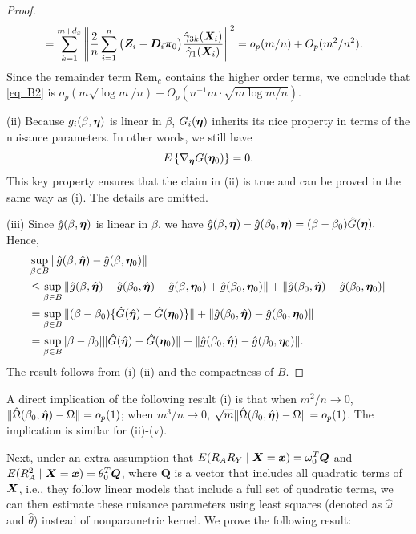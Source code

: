 \documentclass[12pt]{article}
\begin{document}
{\begin{proof}
\begin{align*}
	  &= \sum_{k=1}^{m+d_x}    \left\|  \frac2n \sum_{i=1}^n  \big( \bm{Z}_i-\bm D_i \bm\pi_0 \big)  \frac{\hat{\gamma}_{3k}(\bm{X}_i)}{\hat\gamma_1(\bm{X}_i)} \right\|^2  = o_p(m/n)+ O_p(m^2/n^2). 
\end{align*}
Since the remainder term $ \text{Rem}_c $ contains the higher order terms, we conclude that \eqref{eq: B2} is $ o_p(m\sqrt{\log m}/n) + O_p( n^{-1} m\cdot \sqrt{m\log m/n})$. 



(ii) Because $ g_i(\beta, \bm \eta) $ is linear in $ \beta $, $ G_i(\bm \eta) $ inherits its nice property in terms of the nuisance parameters. In other words, we still have 
\[
E\left\{ \nabla_{\bm \eta} G(\bm \eta_0)\right\} = 0.
\]
This key property ensures that the claim in (ii) is true and can be proved in the same way as (i). The details are omitted. 



(iii) Since $\hat g(\beta, \bm \eta)$ is linear in $\beta$, we have $ \hat g(\beta, \bm \eta)- \hat g(\beta_0, \bm \eta)= (\beta- \beta_0) \hat G(\bm \eta).$ Hence, 
\begin{align*}
    &\sup_{\beta\in B} \|\hat g(\beta, \hat{\bm \eta}) -\hat g(\beta, \bm \eta_0) \| \\
    &\leq   \sup_{\beta\in B} \|\hat g(\beta, \hat{\bm \eta}) - \hat g(\beta_0, \hat{\bm \eta}) -\hat g(\beta, \bm \eta_0) +\hat g(\beta_0, \bm \eta_0) \| + \|\hat g(\beta_0, \hat{\bm \eta}) -\hat g(\beta_0, \bm \eta_0) \| \\
    &= \sup_{\beta\in B} \|(\beta-\beta_0) \{\hat G(\hat {\bm \eta}) -  \hat G( \bm \eta_0)\}\| + \|\hat g(\beta_0, \hat{\bm \eta}) -\hat g(\beta_0, \bm \eta_0) \| \\
    &= \sup_{\beta\in B} |\beta-\beta_0| \| \hat G(\hat {\bm \eta}) -  \hat G( \bm \eta_0)\| + \|\hat g(\beta_0, \hat{\bm \eta}) -\hat g(\beta_0, \bm \eta_0) \|. 
\end{align*}
The result follows from (i)-(ii) and the compactness of $B$. 


\end{proof}

A direct implication of the following result (i) is that when $ m^2/n\rightarrow 0 $, $  \|\hat\Omega(\beta_0,\hat {\bm \eta})- \Omega \| = o_p(1)$; when $ m^3/n\rightarrow 0 $, $  \sqrt{m}\|\hat\Omega(\beta_0,\hat {\bm \eta})- \Omega \| = o_p(1)$. The implication is similar for (ii)-(v). 


{Next, under an extra assumption that $E(R_A R_Y\mid \bm{X} = \bm x ) = \omega_0^T \bm Q $ and $E(R_A^2 \mid \bm{X} = \bm x ) = \theta_0^T \bm Q $, where $\bm Q$ is a vector that includes all quadratic terms of $\bm{X}$,  i.e., they  follow linear models that include a full set of quadratic terms, we can then estimate these nuisance parameters using least squares (denoted as $\hat \omega$ and $\hat\theta$) instead of nonparametric kernel. We prove the following result:

}}
\end{document}
